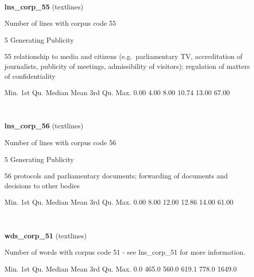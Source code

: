 \documentclass[]{article}
\newenvironment{Shaded}{\begin{snugshade}}{\end{snugshade}}
\newcommand{\FloatTok}[1]{\textcolor[rgb]{0.00,0.00,0.81}{{#1}}}
\newcommand{\NormalTok}[1]{{#1}}
\begin{document}
~

\vspace{1em}

\textbf{lns\_corp\_55} (textlines)

Number of lines with corpus code 55

5 Generating Publicity

55 relationship to media and citizens (e.g.~parliamentary TV,
accreditation of journalists, publicity of meetings, admissibility of
visitors); regulation of matters of confidentiality

\begin{Shaded}
\begin{Highlighting}[]
   \NormalTok{Min. 1st Qu.  Median    Mean 3rd Qu.    Max. }
   \FloatTok{0.00}    \FloatTok{4.00}    \FloatTok{8.00}   \FloatTok{10.74}   \FloatTok{13.00}   \FloatTok{67.00} 
\end{Highlighting}
\end{Shaded}

~

\vspace{1em}

\textbf{lns\_corp\_56} (textlines)

Number of lines with corpus code 56

5 Generating Publicity

56 protocols and parliamentary documents; forwarding of documents and
decisions to other bodies

\begin{Shaded}
\begin{Highlighting}[]
   \NormalTok{Min. 1st Qu.  Median    Mean 3rd Qu.    Max. }
   \FloatTok{0.00}    \FloatTok{8.00}   \FloatTok{12.00}   \FloatTok{12.86}   \FloatTok{14.00}   \FloatTok{61.00} 
\end{Highlighting}
\end{Shaded}

~

\vspace{1em}

\textbf{wds\_corp\_51} (textlines)

Number of words with corpus code 51 - see lns\_corp\_51 for more
information.

\begin{Shaded}
\begin{Highlighting}[]
   \NormalTok{Min. 1st Qu.  Median    Mean 3rd Qu.    Max. }
    \FloatTok{0.0}   \FloatTok{465.0}   \FloatTok{560.0}   \FloatTok{619.1}   \FloatTok{778.0}  \FloatTok{1649.0} 
\end{Highlighting}
\end{Shaded}
\end{document}
